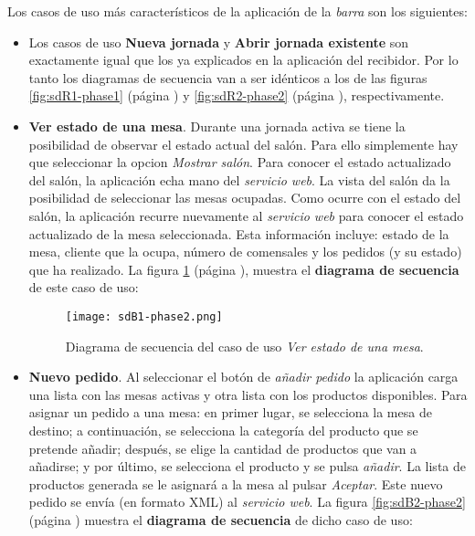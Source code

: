 Los casos de uso más característicos de la aplicación de la \emph{barra} son
los siguientes:
\begin{itemize}
\item Los casos de uso \textbf{Nueva jornada} y \textbf{Abrir jornada
existente} son exactamente igual que los ya explicados en la aplicación
del recibidor. Por lo tanto los diagramas de secuencia van a ser idénticos
a los de las figuras \ref{fig:sdR1-phase1} (página \pageref{fig:sdR1-phase1}) y
\ref{fig:sdR2-phase2} (página \pageref{fig:sdR2-phase2}), respectivamente.
\item \textbf{Ver estado de una mesa}. Durante una jornada activa se tiene
la posibilidad de observar el estado actual del salón. Para ello simplemente
hay que seleccionar la opcion \emph{Mostrar salón}. Para conocer el estado
actualizado del salón, la aplicación echa mano del \emph{servicio web}.
La vista del salón da la posibilidad de seleccionar las mesas ocupadas. Como
ocurre con el estado del salón, la aplicación recurre nuevamente al
\emph{servicio web} para conocer el estado actualizado de la mesa seleccionada.
Esta información incluye: estado de la mesa, cliente que la ocupa, número
de comensales y los pedidos (y su estado) que ha realizado. La figura
\ref{fig:sdB1-phase2} (página \pageref{fig:sdB1-phase2}), muestra el
\textbf{diagrama de secuencia} de este caso de uso:

  \begin{figure}[!h]
    \begin{center}
      \texttt{[image: sdB1-phase2.png]}
      \caption{Diagrama de secuencia del caso de uso \emph{Ver estado de
      una mesa}.}
      \label{fig:sdB1-phase2}
    \end{center}
  \end{figure}

\item \textbf{Nuevo pedido}. Al seleccionar el botón de \emph{añadir pedido}
la aplicación carga una lista con las mesas activas y otra lista con los
productos disponibles. Para asignar un pedido a una mesa: en primer lugar, se
selecciona la mesa de destino; a continuación, se selecciona la categoría
del producto que se pretende añadir; después, se elige la cantidad de
productos que van a añadirse; y por último, se selecciona el producto y se
pulsa \emph{añadir}. La lista de productos generada se le asignará a la mesa
al pulsar \emph{Aceptar}. Este nuevo pedido se envía (en formato \acs{XML})
al \emph{servicio web}. La figura \ref{fig:sdB2-phase2} (página
\pageref{fig:sdB2-phase2}) muestra el \textbf{diagrama de secuencia} de dicho
caso de uso:


\end{itemize}
